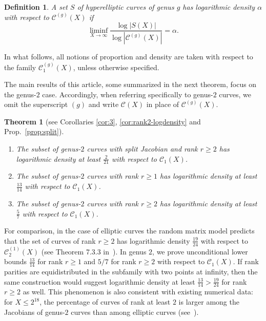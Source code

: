 \documentclass{amsart}
\newcommand{\cC}{\mathcal{C}}
\newtheorem{definition}{Definition}
\newtheorem{theorem}{Theorem}
\begin{document}
\begin{definition}\label{def:density}
A set $S$ of hyperelliptic curves of genus $g$ has logarithmic density $\alpha$ with respect to $\cC^{(g)}(X)$ if  
$$\liminf_{X\rightarrow\infty}\frac{\log |S(X)|}{\log|\cC^{(g)}(X)|}=\alpha. $$
\end{definition}



In what follows, all notions of proportion and density are taken with respect to the family $\cC_1^{(g)}(X)$, unless otherwise specified.


The main results of this article, some summarized in the next theorem, focus on the genus-$2$ case. Accordingly,
when referring specifically to genus-$2$ curves, we omit the superscript
$(g)$ and write $\cC(X)$ in place of $\cC^{(g)}(X)$.


\medskip


\begin{theorem}[see Corollaries \ref{cor:3}, \ref{cor:rank2-logdensity} and Prop.~\ref{prop:split}]\label{th:1}~


\begin{enumerate}
\item The subset of genus-$2$ curves with split Jacobian and rank $r\geq 2$ has logarithmic density at least $\frac{2}{21}$ with respect to $\cC_1(X)$.
\item The subset of genus-$2$ curves with rank $r\geq 1$ has logarithmic density at least $\frac{13}{14}$ with respect to $\cC_1(X)$.
\item The subset of genus-$2$ curves with rank $r\geq 2$ has logarithmic density at least $\frac{5}{7}$ with respect to $\cC_1(X)$.
\end{enumerate}
\end{theorem}
For comparison, in the case of elliptic curves the random matrix model predicts
that the set of curves of rank \(r\geq 2\) has logarithmic density
\(\frac{19}{24}\) with respect to \(\cC_2^{(1)}(X)\) (see
Theorem 7.3.3 in~\cite{Park2019}). In genus \(2\), we prove unconditional lower
bounds \(\frac{13}{14}\) for rank \(r \geq 1\) and \(5/7\) for rank \(r \geq 2\)
with respect to \(\mathcal{C}_1(X)\). If rank parities are equidistributed in the
subfamily with two points at infinity, then the same construction would suggest
logarithmic density at least \(\frac{13}{14}>\frac{19}{24}\) for rank \(r \geq 2\)
as well. This phenomenon is also consistent with existing numerical data: for
\(X \leq 2^{18}\), the percentage of curves of rank at least \(2\) is larger
among the Jacobians of genus-\(2\) curves than among elliptic curves
(see~\cite{OnlineComplement}).
\end{document}
